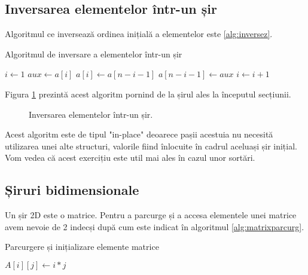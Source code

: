 \subsection{Inversarea elementelor într-un șir}

Algoritmul ce inversează ordinea inițială a elementelor este \ref{alg:inversez}.


\begin{algorithm}[H]
	\caption{Algoritmul de inversare a elementelor într-un șir} \label{alg:inversez}
	\begin{algorithmic}[1]
		\State $i \gets 1$	
		\State $aux \gets a[i]$
		\State $a[i] \gets a[n-i-1]$
		\State $ a[n-i-1] \gets aux$
		\State $i \gets i+1$		
		\EndWhile 
		\EndProcedure
	\end{algorithmic}
\end{algorithm}

Figura \ref{fig:inversare} prezintă acest algoritm pornind de la șirul ales la începutul secțiunii.

\begin{figure}[H] 
	\centering	
	{
	}
	\caption{Inversarea elementelor într-un șir.} 
	\label{fig:inversare}
\end{figure}

Acest algoritm este de tipul "in-place" deoarece pașii acestuia nu necesită utilizarea unei alte structuri, valorile fiind înlocuite în cadrul aceluași șir inițial. Vom vedea că acest exercițiu este util mai ales în cazul unor sortări.

\subsection{Șiruri bidimensionale}

Un șir 2D este o matrice. Pentru a parcurge și a accesa elementele unei matrice avem nevoie de 2 indecși după cum este indicat în algoritmul \ref{alg:matrixparcurg}.

\begin{algorithm}[H]
	\caption{Parcurgere și inițializare elemente matrice}\label{alg:matrixparcurg}
	\begin{algorithmic}[1]
		\State $A[i][j] \gets i*j$
		\EndFor 
		\EndFor 
		\EndProcedure
	\end{algorithmic}
\end{algorithm}


